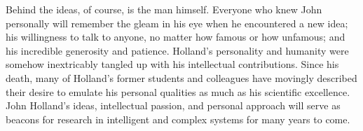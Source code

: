 \documentclass{sig-alternate}
\begin{document}
Behind the ideas, of course, is the man himself.   Everyone who knew
John personally will remember the gleam in his eye when he
encountered a new idea; his willingness to talk to anyone, no matter
how famous or how unfamous; and his incredible generosity and patience.
Holland's personality and humanity were somehow inextricably tangled
up with his intellectual contributions.  Since his death, many of
Holland's former students and colleagues have movingly described their
desire to emulate his personal qualities as much as his scientific
excellence.  John Holland's ideas, intellectual passion, and personal approach will serve as
beacons for research in intelligent and complex systems for many
years to come. 






\end{document}
